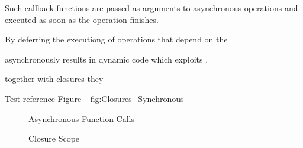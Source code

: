 Such callback functions are passed as arguments to asynchronous operations and executed as soon as the operation finishes.

By deferring the executiong of operations that depend on the 

asynchronously results in dynamic code which exploits .

together with closures they 

Test reference Figure ~\ref{fig:Closures_Synchronous}



\begin{figure}[htb]
\centering
\caption{Asynchronous Function Calls}
\end{figure}


\begin{figure}[htb]
\centering
\caption{Closure Scope}
\end{figure}


